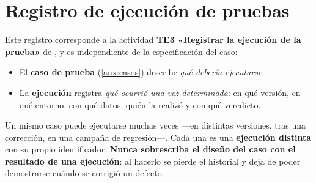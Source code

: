 \section{Registro de ejecución de pruebas}
\label{anx:ejecuciones}

\begin{notanormativa}
Este registro corresponde a la actividad \textbf{TE3 «Registrar la ejecución de la prueba»} de
, y es independiente de la especificación del caso:

\begin{itemize}
  \item El \textbf{caso de prueba} (\ref{anx:casos}) describe \emph{qué debería ejecutarse}.
  \item La \textbf{ejecución} registra \emph{qué ocurrió una vez determinada}: en qué versión,
        en qué entorno, con qué datos, quién la realizó y con qué veredicto.
\end{itemize}

Un mismo caso puede ejecutarse muchas veces —en distintas versiones, tras una corrección, en
una campaña de regresión—. Cada una es una \textbf{ejecución distinta} con su propio
identificador. \textbf{Nunca sobrescriba el diseño del caso con el resultado de una ejecución}:
al hacerlo se pierde el historial y deja de poder demostrarse cuándo se corrigió un defecto.
\end{notanormativa}

\begin{observacion}
\end{observacion}

